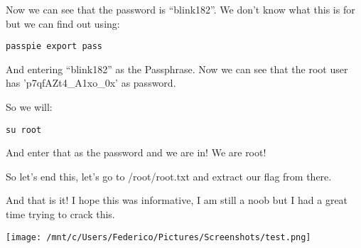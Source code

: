 \documentclass[11pt]{article}
\begin{document}
Now we can see that the password is ``blink182''. We don't know what this is for but
we can find out using:

\begin{verbatim}
passpie export pass
\end{verbatim}

And entering ``blink182'' as the Passphrase. Now we can see that the root user has
'p7qfAZt4\_A1xo\_0x' as password.

So we will:
\begin{verbatim}
su root
\end{verbatim}

And enter that as the password and we are in! We are root!

So let's end this, let's go to /root/root.txt and extract our flag from there.

And that is it! I hope this was informative, I am still a noob but I had a great
time trying to crack this.

\texttt{[image: /mnt/c/Users/Federico/Pictures/Screenshots/test.png]}
\end{document}
